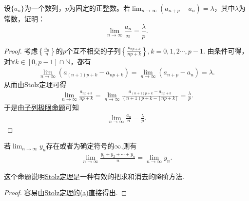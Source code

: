 \documentclass[../../main.tex]{subfiles}%
\begin{document}
\begin{proposition}\label{proposition:Stolz公式的推论111}
设$\{a_n\}$为一个数列，$p$为固定的正整数。若$\lim_{n \to \infty} (a_{n+p} - a_n) = \lambda$，其中$\lambda$为常数，证明：
\[
\lim_{n \to \infty} \frac{a_n}{n} = \frac{\lambda}{p}.
\]
\end{proposition}
\begin{proof}

考虑$\left\{ \frac{a_n}{n} \right\}$的$p$个互不相交的子列$\left\{ \frac{a_{np+k}}{np+k} \right\},k=0,1,2\cdots,p-1$.
由条件可得，对$\forall k\in \left[ 0,p-1 \right] \cap \mathbb{N}$，都有
\begin{align*}
\lim_{n\rightarrow \infty}\left( a_{\left( n+1 \right) p+k}-a_{np+k} \right)=\lim_{n\rightarrow \infty}\left( a_{n+p}-a_n \right)=\lambda.
\end{align*}
从而由Stolz定理可得
\begin{align*}
\lim_{n\rightarrow \infty}\frac{a_{np+k}}{np+k}=\lim_{n\rightarrow \infty}\frac{a_{\left( n+1 \right) p+k}-a_{np+k}}{\left( n+1 \right) p+k-\left[ np+k \right]}=\frac{\lambda}{p}.
\end{align*}
于是由\hyperref[proposition:子列极限命题]{子列极限命题}可知
\begin{align*}
\lim_{n\rightarrow \infty}\frac{a_n}{n}=\frac{\lambda}{p}.
\end{align*}

\end{proof}

\begin{proposition}[Cauchy命题]\label{proposition:Cauchy命题}
若\(\lim_{n \to \infty} y_n\)存在或者为确定符号的\(\infty\),则有
\begin{align*}
\lim_{n \to \infty} \frac{y_1 + y_2 + \cdots + y_n}{n} = \lim_{n \to \infty} y_n.
\end{align*}
\end{proposition}
\begin{note}
这个命题说明\hyperref[theorem:Stolz定理]{Stolz定理}是一种有效的把求和消去的降阶方法.
\end{note}
\begin{proof}

容易由\hyperref[theorem:Stolz定理]{Stolz定理的(a)}直接得出.

\end{proof}
\end{document}
